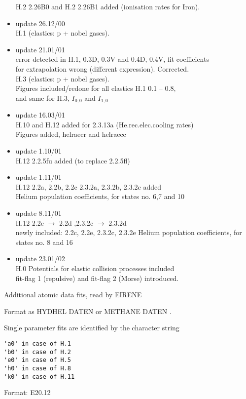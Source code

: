 \documentclass[12pt]{article}
\begin{document}
\begin{itemize}
  H.2 2.26B0 and H.2 2.26B1 added (ionisation rates for Iron).
 \item update  26.12/00 \\
  H.1 (elastics: p + nobel gases).
 \item update  21.01/01 \\
  error detected in H.1, 0.3D, 0.3V and 0.4D, 0.4V, fit coefficients\\
  for extrapolation wrong (different expression). Corrected.\\
  H.3 (elastics: p + nobel gases).\\
  Figures included/redone for all elastics H.1  0.1 -- 0.8, \\
  and same for H.3, $I_{0,0}$ and $I_{1,0}$
 \item update  16.03/01 \\
  H.10 and H.12 added for 2.3.13a (He.rec.elec.cooling rates)\\
  Figures added, helraecr and helraecc
 \item update  1.10/01 \\
  H.12  2.2.5fu added (to replace 2.2.5fl)
 \item update  1.11/01 \\
  H.12  2.2a, 2.2b, 2.2c 2.3.2a, 2.3.2b, 2.3.2c added \\
  Helium population coefficients, for states no. 6,7 and 10
 \item update  8.11/01 \\
  H.12  2.2c $\rightarrow$ 2.2d ,2.3.2c $\rightarrow$ 2.3.2d \\
  newly included: 2.2c, 2.2e,  2.3.2c,  2.3.2e
  Helium population coefficients, for states no. 8 and 16
 \item update  23.01/02 \\
  H.0  Potentials for elastic collision processes included\\
  fit-flag 1 (repulsive) and fit-flag 2 (Morse) introduced.
\end{itemize}
\newpage
Additional atomic data fits, read by EIRENE

Format as HYDHEL DATEN \cite{kn:Janev}
or METHANE DATEN \cite{kn:Ehrhardt}.
\newpage

Single parameter fits are identified by the character string
\begin{small}\begin{verbatim}
'a0' in case of H.1
'b0' in case of H.2
'e0' in case of H.5
'h0' in case of H.8
'k0' in case of H.11
\end{verbatim}\end{small}
Format: E20.12
\end{document}

